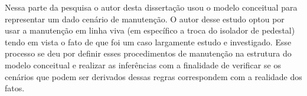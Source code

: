 Nessa parte da pesquisa o autor desta dissertação usou o modelo conceitual para representar um dado cenário de manutenção. O autor desse estudo optou por usar a manutenção em linha viva (em específico a troca do isolador de pedestal) tendo em vista o fato de que foi um caso largamente estudo e investigado. Esse processo se deu por definir esses procedimentos de manutenção na estrutura do modelo conceitual e realizar as inferências com a finalidade de verificar se os cenários que podem ser derivados dessas regras correspondem com a realidade dos fatos. 